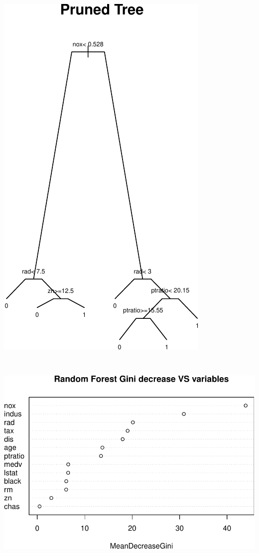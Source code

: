 \documentclass[]{article}
\begin{document}
\begin{center}\includegraphics{HW4_Solution_files/figure-latex/unnamed-chunk-14-1} \end{center}

~

\includegraphics{HW4_Solution_files/figure-latex/unnamed-chunk-15-1.pdf}
\end{document}
